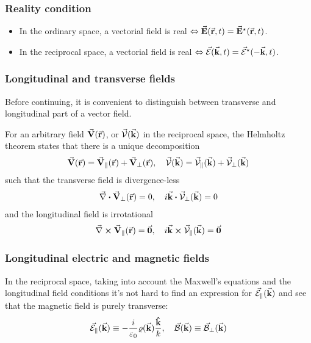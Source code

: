\subsubsection*{Reality condition}
\begin{itemize}
	\item In the ordinary space, a vectorial field is real $\Leftrightarrow \va{E}(\va{r},t) = \va{E}^{\star}{}(\va{r},t)$.
	\item In the reciprocal space, a vectorial field is real $\Leftrightarrow \va{\mathcal{E}}(\va{k},t) = \va{\mathcal{E}}^{\star}{}(-\va{k},t)$.
\end{itemize}

\subsubsection*{Longitudinal and transverse fields}
Before continuing, it is convenient to distinguish between transverse and longitudinal part of a vector field.
\begin{thm}
	For an arbitrary field $\va{V}(\va{r})$, or $\va{\mathcal{V}}(\va{k})$ in the reciprocal space, the Helmholtz theorem states that there is a unique decomposition
	\begin{align}
		\va{V}(\va{r}) = \lng{\va{V}}(\va{r}) + \trn{\va{V}}(\va{r}) \qc \vare{V}(\va{k}) = \lng{\vare{V}}(\va{k}) + \trn{\vare{V}}(\va{k})
	\end{align}
	such that the transverse field is divergence-less
	\begin{align}
		\trn{\div{V}}(\va{r}) = 0 \qc i\va{k} \vdot \trn{\vare{V}}(\va{k}) = 0
	\end{align}
	and the longitudinal field is irrotational
	\begin{align}
		\lng{\curl{V}}(\va{r}) = \va{0} \qc i\va{k} \cross \lng{\vare{V}}(\va{k}) = \va{0}
	\end{align}
\end{thm}

\subsubsection*{Longitudinal electric and magnetic fields}
In the reciprocal space, taking into account the Maxwell's equations and the longitudinal field conditions it's not hard to find an expression for ${\va{\mathcal{E}}}_{\parallel}(\va{k})$ and see that the magnetic field is purely transverse:
\begin{align}
	\lng{\vare{E}}(\va{k}) \equiv - \frac{i}{\varepsilon_{0}} \varrho (\va{k}) \frac{\vu{k}}{k} \qc \vare{B}(\va{k}) \equiv \trn{\vare{B}}(\va{k})
\end{align}

